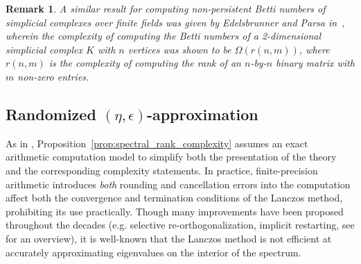\documentclass[pdflatex,sn-mathphys-num]{sn-jnl}
\newtheorem{remark}{Remark}
\begin{document}
\begin{remark}
	A similar result for computing \emph{non-persistent} Betti numbers of simplicial complexes over finite fields was given by Edelsbrunner and Parsa in~\cite{edelsbrunner2014computational}, wherein the complexity of computing the Betti numbers of a 2-dimensional simplicial complex $K$ with $n$ vertices was shown to be $\Omega(r(n, m))$, where $r(n, m)$ is the complexity of computing the rank of an $n$-by-$n$ binary matrix with $m$ non-zero entries.
\end{remark}

\subsection{Randomized \(\left. (\eta,\epsilon) \right.\)-approximation}\label{sec:iterative_approx}
As in \cite{parlett1994we}, Proposition~\ref{prop:spectral_rank_complexity} assumes an exact arithmetic computation model to simplify both the presentation of the theory and the corresponding complexity statements. In practice, finite-precision arithmetic introduces \emph{both} rounding and cancellation errors into the computation affect both the convergence and termination conditions of the Lanczos method, prohibiting its use practically. Though many improvements have been proposed throughout the decades (e.g. selective re-orthogonalization, implicit restarting, see \cite{sorensen1995implicitly}\cite{lehoucq1998arpack} for an overview), it is well-known that the Lanczos method is not efficient at accurately approximating eigenvalues on the interior of the spectrum.
\end{document}

